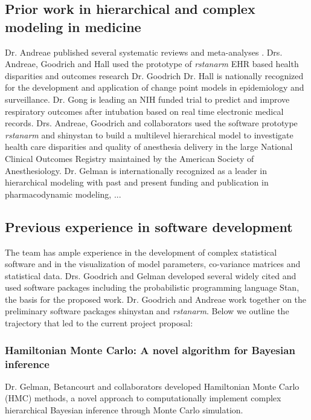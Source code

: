 \documentclass[11pt,notitlepage]{article}
\begin{document}
\subsection*{Prior work in hierarchical and complex modeling in medicine} Dr. Andreae published several systematic reviews and meta-analyses \cite{Andreae2013, Andreae2015, Carter2015}. Drs. Andreae, Goodrich and Hall used the prototype of \textit{rstanarm} EHR based health disparities and outcomes research \cite{AndreaeWhite2015} Dr. Goodrich Dr. Hall is nationally recognized for the development and application of change point models in epidemiology and surveillance. Dr. Gong is leading an NIH funded trial to predict and improve respiratory outcomes after intubation based on real time electronic medical records.  Drs. Andreae, Goodrich and collaborators used the software prototype \textit{rstanarm} and shinystan to build a multilevel hierarchical model to investigate health care disparities and quality of anesthesia delivery in the large National Clinical Outcomes Registry maintained by the American Society of Anesthesiology. Dr. Gelman is internationally recognized as a leader in hierarchical modeling with past and present funding and publication in pharmacodynamic modeling, ...

\subsection*{Previous experience in software development} 
The team has ample experience in the development of complex statistical software and in the visualization of model parameters, co-variance matrices and statistical data.  Drs. Goodrich and Gelman developed several widely cited and used software packages including the probabilistic programming language Stan\cite{SDT2014}, the basis for the proposed work. Dr. Goodrich and Andreae work together on the preliminary software packages shinystan and \textit{rstanarm}. Below we outline the trajectory that led to the current project proposal:
\newline

\subsubsection*{Hamiltonian Monte Carlo: A novel algorithm for Bayesian inference}
Dr. Gelman, Betancourt and collaborators developed Hamiltonian Monte Carlo (HMC) methods, a novel approach to computationally implement complex hierarchical Bayesian inference through Monte Carlo simulation. 
\end{document}
